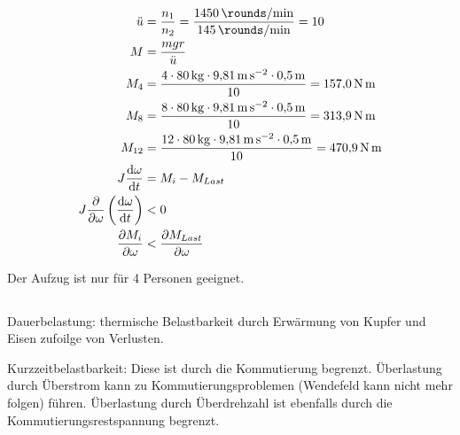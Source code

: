 \documentclass[11pt,a4paper]{scrartcl}
\newcommand{\mybr}[1]{\left(#1\right)}
\newcommand{\0}{_{\mybr{0}}}
\newcommand{\1}{_{\mybr{1}}}
\newcommand{\2}{_{\mybr{2}}}
\renewcommand{\d}{\mathrm{d}}
\begin{document}
\subsection{}
\begin{align}
\ddot{u}&=\frac{n_1}{n_2}=\frac{\SI{1450}{\rounds\per\minute}}{\SI{145}{\rounds\per\minute}}=\num{10}\\
M&=\frac{m g r}{\ddot{u}}\\
M_4&=\frac{4\cdot\SI{80}{\kilogram}\cdot\SI{9.81}{\meter\per\second\squared}\cdot\SI{0.5}{\metre}}{10}=\SI{157.0}{\newton\metre}\\
M_8&=\frac{8\cdot\SI{80}{\kilogram}\cdot\SI{9.81}{\meter\per\second\squared}\cdot\SI{0.5}{\metre}}{10}=\SI{313.9}{\newton\metre}\\
M_{12}&=\frac{12\cdot\SI{80}{\kilogram}\cdot\SI{9.81}{\meter\per\second\squared}\cdot\SI{0.5}{\metre}}{10}=\SI{470.9}{\newton\metre}\\
J\frac{\d\omega}{\d t}&=M_i-M_{Last}\\
J\frac{\partial}{\partial\omega}\mybr{\frac{\d\omega}{\d t}}&<0\\
\frac{\partial M_i}{\partial\omega}&<\frac{\partial M_{Last}}{\partial\omega}
\end{align}
\begin{figure*}[!hp]
	\centering
\end{figure*}
Der Aufzug ist nur für 4 Personen geeignet.

\subsection{}
Dauerbelastung: thermische Belastbarkeit durch Erwärmung von Kupfer und Eisen zufoilge von Verlusten.

Kurzzeitbelastbarkeit: Diese ist durch die Kommutierung begrenzt. Überlastung durch Überstrom kann zu Kommutierungsproblemen (Wendefeld kann nicht mehr folgen) führen. Überlastung durch Überdrehzahl ist ebenfalls durch die Kommutierungsrestspannung begrenzt.
\end{document}
